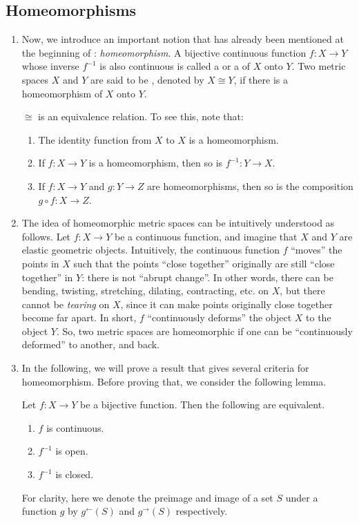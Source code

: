 \subsection{Homeomorphisms}
\begin{enumerate}
\item Now, we introduce an important notion that has already been mentioned at
the beginning of : \emph{homeomorphism}. A bijective
continuous function \(f:X\to Y\) whose inverse \(f^{-1}\) is also continuous is
called a  or a  of \(X\) onto
\(Y\). Two metric spaces \(X\) and \(Y\) are said to be ,
denoted by \(X\cong Y\), if there is a homeomorphism of \(X\) onto \(Y\).

\begin{note}
\(\cong\) is an equivalence relation. To see this, note that:
\begin{enumerate}
\item The identity function from \(X\) to \(X\) is a homeomorphism.
\item If \(f:X\to Y\) is a homeomorphism, then so is \(f^{-1}:Y\to X\).
\item If \(f:X\to Y\) and \(g:Y\to Z\) are homeomorphisms, then so is the
composition \(g\circ f:X\to Z\).
\end{enumerate}
\end{note}
\item The idea of homeomorphic metric spaces can be intuitively understood as
follows.  Let \(f:X\to Y\) be a continuous function, and imagine that \(X\) and
\(Y\) are elastic geometric objects. Intuitively, the continuous function \(f\)
``moves'' the points in \(X\) such that the points ``close together''
originally are still ``close together'' in \(Y\): there is not ``abrupt
change''. In other words, there can be bending, twisting, stretching, dilating,
contracting, etc. on \(X\), but there cannot be \emph{tearing} on \(X\), since
it can make points originally close together become far apart. In short, \(f\)
``continuously deforms'' the object \(X\) to the object \(Y\). So, two metric
spaces are homeomorphic if one can be ``continuously deformed'' to another, and
back.

\item In the following, we will prove a result that gives several criteria for
homeomorphism. Before proving that, we consider the following lemma.

\begin{lemma}
\label{lma:bij-cts-crit}
Let \(f:X\to Y\) be a bijective function. Then the following are equivalent.
\begin{enumerate}
\item \(f\) is continuous.
\item \(f^{-1}\) is open.
\item \(f^{-1}\) is closed.
\end{enumerate}
\end{lemma}
\begin{pf}
For clarity, here we denote the preimage and image of a set \(S\) under a
function \(g\) by \(g^{\leftarrow}(S)\) and \(g^{\rightarrow}(S)\)
respectively.


\end{pf}
\end{enumerate}
